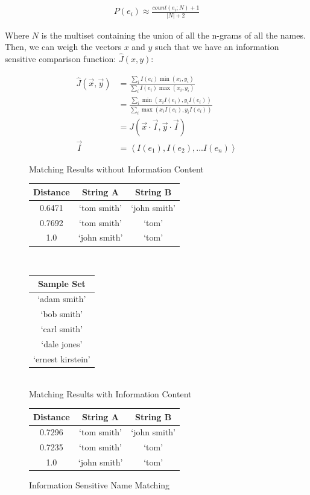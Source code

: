 \documentclass[11pt]{article}
\begin{document}
\begin{align*}
P(e_i) \approx \frac{count(e_i; N)+1}{|N|+2}
\end{align*}

Where $N$ is the multiset containing the union of all the n-grams of
all the names. 
Then, we can weigh the vectors $x$ and $y$ such that we have
an information sensitive comparison function: $\hat{J}(x,y)$:

\begin{align*}
\hat{J}(\vec{x},\vec{y}) 
&= \frac{
    \sum_i I(e_i)\min(x_i, y_i)
}{
    \sum_i I(e_i)\max(x_i, y_i)
}\\
&= \frac{
    \sum_i \min(x_iI(e_i), y_iI(e_i))
}{
    \sum_i \max(x_iI(e_i), y_iI(e_i))
}\\
&= J\left(\vec{x} \cdot \vec{I}, \vec{y} \cdot \vec{I} \right)\\
\vec{I} &= \left< I(e_1), I(e_2), ... I(e_n) \right>
\end{align*}

\begin{figure}[h!]
    \centering
Matching Results without Information Content\\
\begin{tabular}{c|c|c}
  Distance & String A & String B \\
\hline
  0.6471 & `tom smith' & `john smith' \\
  0.7692 & `tom smith' & `tom' \\
  1.0 & `john smith' & `tom'
\end{tabular}
\\
\begin{tabular}{ c}
Sample Set\\
\hline
`adam smith' \\
`bob smith' \\
`carl smith' \\
`dale jones' \\
`ernest kirstein'
\end{tabular}
\\
Matching Results with Information Content\\
\begin{tabular}{c|c|c}
  Distance & String A & String B \\
\hline
  0.7296 & `tom smith' & `john smith' \\
  0.7235 & `tom smith' & `tom' \\
  1.0 & `john smith' & `tom'
\end{tabular}
\caption{Information Sensitive Name Matching}
\label{fig:lev_comp}
\end{figure}
\end{document}
